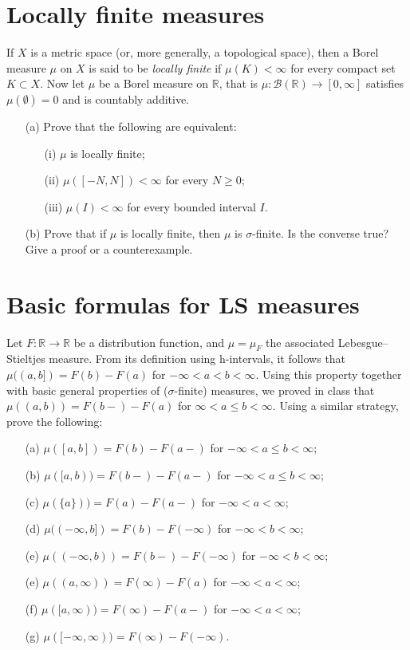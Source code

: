 \documentclass[lang=cn,11pt]{elegantbook}
\begin{document}
\section{Locally finite measures}
  If $X$ is a metric space (or, more generally, a topological space), then a Borel measure $\mu$ on $X$ is said to be \emph{locally finite} if $\mu(K)<\infty$ for every compact set $K\subset X$. Now let $\mu$ be a Borel measure on $\mathbb{R}$, that is $\mu\colon\mathcal{B}(\mathbb{R})\to[0,\infty]$ satisfies $\mu(\emptyset)=0$ and is countably additive.
  \begin{itemize}
  \item[(a)]
    Prove that the following are equivalent:
    \begin{itemize}
    \item[(i)]
      $\mu$ is locally finite;
    \item[(ii)]
      $\mu([-N,N])<\infty$ for every $N\ge0$;
    \item[(iii)]
      $\mu(I)<\infty$ for every bounded interval $I$.
    \end{itemize}
  \item[(b)]
    Prove that if $\mu$ is locally finite, then $\mu$ is $\sigma$-finite. Is the converse true? Give a proof or a counterexample.
  \end{itemize}
  
\section{Basic formulas for LS measures}
  Let $F\colon\mathbb{R}\to\mathbb{R}$ be a distribution function, and $\mu=\mu_F$ the associated Lebesgue--Stieltjes measure. From its definition using h-intervals, it follows that $\mu((a,b])=F(b)-F(a)$ for $-\infty<a<b<\infty$. Using this property together with basic general properties of ($\sigma$-finite) measures, we proved in class that $\mu((a,b))=F(b-)-F(a)$ for $\infty<a\le b<\infty$. Using a similar strategy, prove the following:
  \begin{itemize}
  \item[(a)]
    $\mu([a,b])=F(b)-F(a-)$ for $-\infty<a\le b<\infty$;
  \item[(b)]
    $\mu([a,b))=F(b-)-F(a-)$ for $-\infty<a\le b<\infty$;
  \item[(c)]
    $\mu(\{a\}))=F(a)-F(a-)$ for $-\infty<a<\infty$;
  \item[(d)]
    $\mu((-\infty,b])=F(b)-F(-\infty)$ for $-\infty<b<\infty$;
  \item[(e)]
    $\mu((-\infty,b))=F(b-)-F(-\infty)$ for $-\infty<b<\infty$;
  \item[(e)]
    $\mu((a,\infty))=F(\infty)-F(a)$ for $-\infty<a<\infty$;
  \item[(f)]
    $\mu([a,\infty))=F(\infty)-F(a-)$ for $-\infty<a<\infty$;
  \item[(g)]
    $\mu([-\infty,\infty))=F(\infty)-F(-\infty)$.
  \end{itemize}
\end{document}
